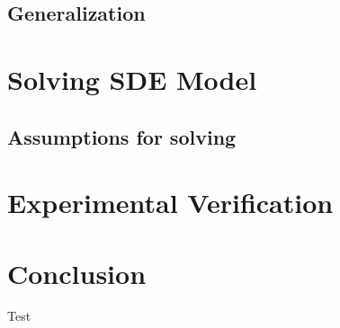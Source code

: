 \documentclass[12pt]{article}
\theoremstyle{definition}
\numberwithin{equation}{section}
\begin{document}
\subsection{Generalization}
\section{Solving SDE Model}
\label{sec:SolvingSDEModel}
\subsection{Assumptions for solving}
\section{Experimental Verification} 
\label{sec:ExperimentalVerification}
\section{Conclusion}
Test

\printbibliography
\end{document}
